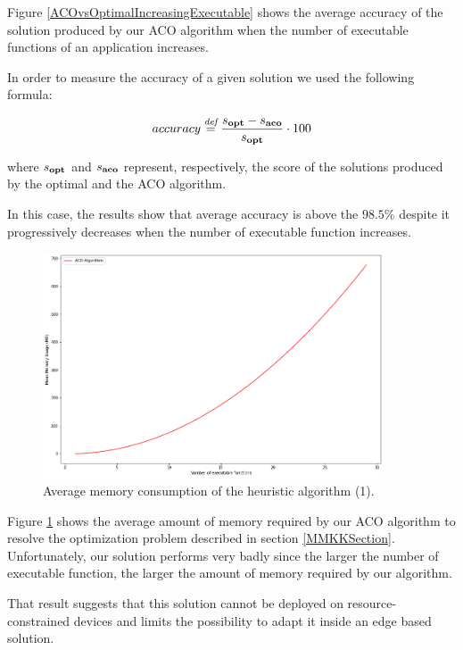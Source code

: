 \documentclass[12pt,a4paper]{report}
\newcommand{\mathDef}{\overset{\textit{def}}{=}}
\begin{document}
Figure \ref{ACOvsOptimalIncreasingExecutable} shows the average accuracy of the solution produced by our ACO algorithm when the number of executable functions of an application increases. 

In order to measure the accuracy of a given solution we used the following formula:

\begin{equation}
	accuracy \mathDef \dfrac{s_{\text{\textbf{opt}}} - s_{\text{\textbf{aco}}}}{s_{\text{\textbf{opt}}}} \cdot 100
\end{equation}

where $s_{\text{\textbf{opt}}}$ and $s_{\text{\textbf{aco}}}$ represent, respectively, the score of the solutions produced by the optimal and the ACO algorithm.

In this case, the results show that average accuracy is above the $98.5$\% despite it progressively decreases when the number of executable function increases. 

\begin{figure}[h]
	\centering
	\includegraphics[width=0.9\textwidth]{./Images/ACORamConsumptionIncreasingExecutable.png}
	\caption{Average memory consumption of the heuristic algorithm (1).}%
	\label{ACORamConsumptionIncreasingExecutable}
\end{figure}

Figure \ref{ACORamConsumptionIncreasingExecutable} shows the average amount of memory required by our ACO algorithm to resolve the optimization problem described in section \ref{MMKKSection}. Unfortunately, our solution performs very badly since the larger the number of executable function, the larger the amount of memory required by our algorithm. 

That result suggests that this solution cannot be deployed on resource-constrained devices and limits the possibility to adapt it inside an edge based solution.
\end{document}
